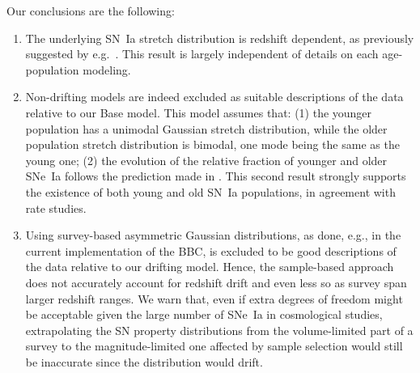 \documentclass[]{aa} %
\newcommand{\nn}[1]{{\textcolor[rgb]{0.25, 0.50, 0}{#1}}}
\begin{document}
Our conclusions are the following:
\begin{enumerate}

    \item The underlying SN~Ia stretch distribution is redshift dependent, as
        previously suggested by e.g.~\cite{howell2007}. This result is largely
        independent of details on each age-population modeling.
    
    \item Non-drifting models are indeed excluded as suitable descriptions of
        the data relative to our Base model. This model assumes that: (1) the
        younger population has a unimodal Gaussian stretch distribution, while
        the older population stretch distribution is bimodal, one mode being the
        same as the young one; (2) the evolution of the relative fraction of
        younger and older SNe~Ia follows the prediction made in
        \cite{rigault2018}. This second result strongly supports the existence of both young and old SN~Ia populations, in agreement with rate studies.
        
    \item Using survey-based asymmetric Gaussian distributions, as  done, e.g.,
        in the current implementation of the BBC, is excluded to be good
        descriptions of the data relative to our drifting model. Hence, the
        sample-based approach does not accurately account for redshift drift and
        even less so as survey span larger redshift ranges. We warn that, even
        if extra degrees of freedom might be acceptable \nn{given the large
        number of SNe~Ia in} cosmological studies, extrapolating the SN property
        distributions from the volume-limited part of a survey to the
        magnitude-limited one affected by sample selection would still be
        inaccurate since the distribution would drift.



\end{enumerate}
\end{document}
